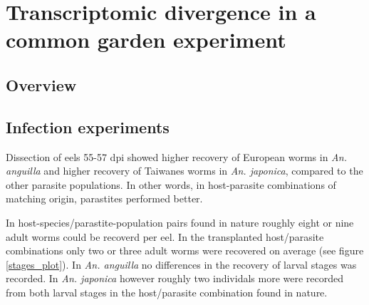 
\chapter{Transcriptomic divergence in a common garden experiment}
\label{cha:tra-diff}


\ifpdf
    \graphicspath{{6_rna_seq/figures/PNG/}{6_rna_seq/figures/PDF/}{6_rna_seq/figures/}}
\else
    \graphicspath{{6_rna_seq/figures/EPS/}{6_rna_seq/figures/}}
\fi



\section{Overview}


\section{Infection experiments}

Dissection of eels 55-57 dpi showed higher recovery of European worms
in \textit{An. anguilla} and higher recovery of Taiwanes worms in
\textit{An. japonica}, compared to the other parasite populations. In
other words, in host-parasite combinations of matching origin,
parastites performed better.


In host-species/parastite-population pairs found in nature roughly
eight or nine adult worms could be recoverd per eel. In the
transplanted host/parasite combinations only two or three adult worms
were recovered on average (see figure \ref{stages_plot}). In
\textit{An. anguilla} no differences in the recovery of larval stages
was recorded. In \textit{An. japonica} however roughly two individals
more were recorded from both larval stages in the host/parasite
combination found in nature.

